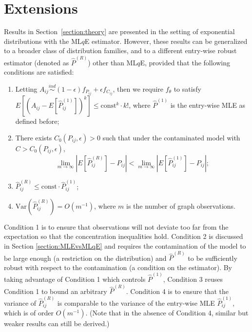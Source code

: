 \documentclass[a4paper]{article}
\renewcommand{\hat}{\widehat}
\begin{document}
\section{Extensions}
\label{section:extension}

Results in Section~\ref{section:theory} are presented in the setting of exponential distributions with the ML$q$E estimator. However, these results can be generalized to a broader class of distribution families, and to a different entry-wise robust estimator (denoted as $\hat{P}^{(R)}$) other than ML$q$E, provided that the following conditions are satisfied:
\begin{enumerate}
\item Letting $A_{ij} \stackrel{ind}{\sim} (1-\epsilon) f_{P_{ij}} + \epsilon f_{C_{ij}}$, then we require $f_\theta$ to satisfy $E[(A_{ij} - E[\hat{P}_{ij}^{(1)}])^k] \le \mathrm{const}^k \cdot k!$, where $\hat{P}^{(1)}$ is the entry-wise MLE as defined before;
\item There exists $C_0(P_{ij}, \epsilon) > 0$ such that under the contaminated model with $C > C_0(P_{ij}, \epsilon)$,
\[
	\lim_{m \to \infty} \left| E[\hat{P}^{(R)}_{ij}] - P_{ij} \right| < 
    \lim_{m \to \infty} \left| E[\hat{P}^{(1)}_{ij}] - P_{ij} \right|;
\]
\item $\hat{P}^{(R)}_{ij} \le \mathrm{const} \cdot \hat{P}_{ij}^{(1)}$;
\item $\mathrm{Var}(\hat{P}^{(R)}_{ij}) = O(m^{-1})$, where $m$ is the number of graph observations.
\end{enumerate}


Condition 1 is to ensure that observations will not deviate too far from the expectation so that the concentration inequalities hold.
Condition 2 is discussed in Section \ref{section:MLEvsMLqE} and requires the contamination of the model to be large enough (a restriction on the distribution) and $\hat{P}^{(R)}$ to be sufficiently robust with respect to the contamination (a condition on the estimator).
By taking advantage of Condition 1 which controls $\hat{P}^{(1)}$, Condition 3 reuses Condition 1 to bound an arbitrary $\hat{P}^{(R)}$.
Condition 4 is to ensure that the variance of $\hat{P}^{(R)}_{ij}$ is comparable to the variance of the entry-wise MLE $\hat{P}^{(1)}_{ij}$, which is of order $O(m^{-1})$. (Note that in the absence of Condition 4, similar but weaker results can still be derived.)
\end{document}
